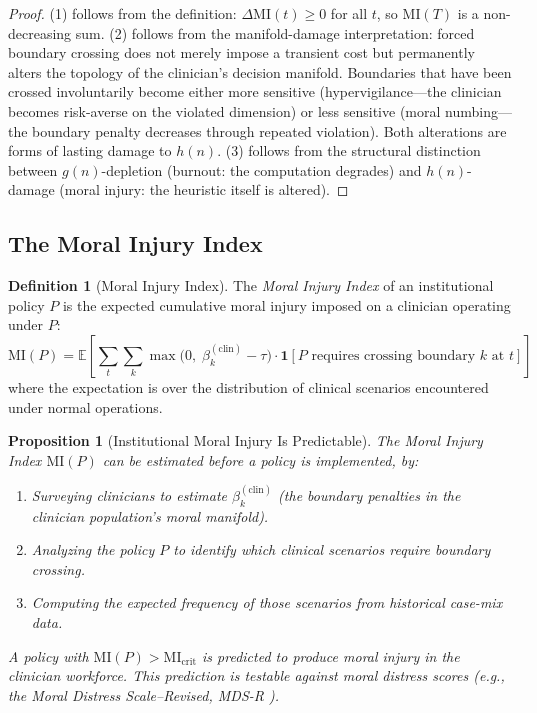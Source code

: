\documentclass[12pt]{article}
\newtheorem{proposition}[theorem]{Proposition}
\theoremstyle{definition}
\newtheorem{definition}[theorem]{Definition}
\theoremstyle{remark}
\newcommand{\MI}{\mathrm{MI}}              %
\begin{document}
\begin{proof}
(1) follows from the definition: $\Delta \MI(t) \geq 0$ for all $t$, so $\MI(T)$ is a non-decreasing sum.  (2) follows from the manifold-damage interpretation: forced boundary crossing does not merely impose a transient cost but permanently alters the topology of the clinician's decision manifold.  Boundaries that have been crossed involuntarily become either more sensitive (hypervigilance---the clinician becomes risk-averse on the violated dimension) or less sensitive (moral numbing---the boundary penalty decreases through repeated violation).  Both alterations are forms of lasting damage to $h(n)$.  (3) follows from the structural distinction between $g(n)$-depletion (burnout: the computation degrades) and $h(n)$-damage (moral injury: the heuristic itself is altered).
\end{proof}

\subsection{The Moral Injury Index}

\begin{definition}[Moral Injury Index]
\label{def:mi_index}
The \emph{Moral Injury Index} of an institutional policy $P$ is the expected cumulative moral injury imposed on a clinician operating under $P$:
\begin{equation}
\MI(P) = \mathbb{E}\left[\sum_{t} \sum_k \max\bigl(0,\; \beta_k^{(\text{clin})} - \tau\bigr) \cdot \mathbf{1}[P \text{ requires crossing boundary } k \text{ at } t]\right]
\label{eq:mi_index}
\end{equation}
where the expectation is over the distribution of clinical scenarios encountered under normal operations.
\end{definition}

\begin{proposition}[Institutional Moral Injury Is Predictable]
\label{prop:mi_predictable}
The Moral Injury Index $\MI(P)$ can be estimated \emph{before} a policy is implemented, by:
\begin{enumerate}
    \item Surveying clinicians to estimate $\beta_k^{(\text{clin})}$ (the boundary penalties in the clinician population's moral manifold).
    \item Analyzing the policy $P$ to identify which clinical scenarios require boundary crossing.
    \item Computing the expected frequency of those scenarios from historical case-mix data.
\end{enumerate}
A policy with $\MI(P) > \MI_{\text{crit}}$ is predicted to produce moral injury in the clinician workforce.  This prediction is testable against moral distress scores (e.g., the Moral Distress Scale--Revised, MDS-R \cite{hamric2012}).
\end{proposition}
\end{document}
